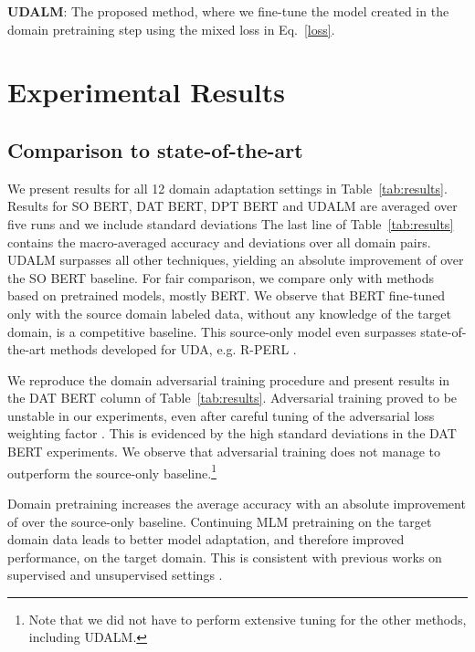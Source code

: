 \documentclass[11pt]{article}
\begin{document}
\vspace*{-4mm}

\noindent\textbf{UDALM}: The proposed method, where we fine-tune the model created in the domain pretraining step using the mixed loss in Eq.~\ref{loss}.

\section{Experimental Results}
\subsection{Comparison to state-of-the-art}

We present results for all 12 domain adaptation settings in Table~\ref{tab:results}. 
Results for SO BERT, DAT BERT, DPT BERT and UDALM are averaged over five runs and we include standard deviations
The last line of Table~\ref{tab:results} contains the macro-averaged accuracy and deviations over all domain pairs. UDALM surpasses all other techniques, yielding an absolute improvement of  over the SO BERT baseline. For fair comparison, we compare only with methods based on pretrained models, mostly BERT. We observe that BERT fine-tuned only with the source domain labeled data, without any knowledge of the target domain, is a competitive baseline. This source-only model even surpasses state-of-the-art methods developed for UDA, e.g. R-PERL \citep{ben2020perl}.

We reproduce the domain adversarial training procedure and present results in the DAT BERT column of Table~\ref{tab:results}. Adversarial training proved to be unstable in our experiments, even after careful tuning of the adversarial loss weighting factor . This is evidenced by the high standard deviations in the DAT BERT experiments. We observe that adversarial training does not manage to outperform the source-only baseline.\footnote{Note that we did not have to perform extensive tuning for the other methods, including UDALM.}

Domain pretraining increases the average accuracy with an absolute improvement of  over the source-only baseline.
Continuing MLM pretraining on the target domain data leads to better model adaptation, and therefore improved performance, on the target domain.
This is consistent with previous works on supervised  \citep{gururangan-etal-2020-dont, xu-etal-2019-bert, sun2019fine} and unsupervised settings \citep{han-eisenstein-2019-unsupervised, du-etal-2020-adversarial}. 
\end{document}
